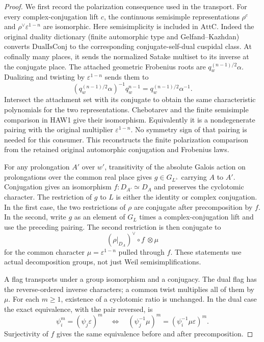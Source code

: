 \begin{proof}
We first record the polarization consequence used in the
transport.  For every complex-conjugation lift $c$, the
continuous semisimple representations
$\rho^c$ and $\rho^\vee\varepsilon^{1-n}$ are isomorphic.
Here semisimplicity is included in $\mathrm{AttC}$.
Indeed the original duality dictionary (finite automorphic
type and Gelfand--Kazhdan) converts $\mathrm{DualIsConj}$
to the corresponding conjugate-self-dual cuspidal class.
At cofinally many places, it sends the normalized Satake
multiset to its inverse at the conjugate place.  The attached
geometric Frobenius roots are $q_w^{(n-1)/2}\alpha$.
Dualizing and twisting by $\varepsilon^{1-n}$ sends them to
\[
       (q_w^{(n-1)/2}\alpha)^{-1}q_w^{n-1}
                             =q_w^{(n-1)/2}\alpha^{-1}.
\]
Intersect the attachment set with its conjugate to obtain
the same characteristic polynomials for the two
representations.  Chebotarev and the finite semisimple
comparison in HAW1 give their isomorphism.  Equivalently it
is a nondegenerate pairing with the original multiplier
$\varepsilon^{1-n}$.  No symmetry sign of that pairing is
needed for this consumer.  This reconstructs the finite
polarization comparison from the retained original
automorphic conjugation and Frobenius laws.

For any prolongation $A'$ over $w'$, transitivity of the
absolute Galois action on prolongations over the common real
place gives $g\in G_{L^+}$ carrying $A$ to $A'$.  Conjugation
gives an isomorphism $f:D_{A'}\simeq D_A$ and preserves
the cyclotomic character.  The restriction of $g$ to $L$ is
either the identity or complex conjugation.  In the first
case, the two restrictions of $\rho$ are conjugate after
precomposition by $f$.  In the second, write $g$ as an
element of $G_L$ times a complex-conjugation lift and use
the preceding pairing.  The second restriction is then
conjugate to
\[
          (\rho|_{D_A})^\vee\circ f\ \otimes\mu
 \tag{HAW.21}
\]
for the common character $\mu=\varepsilon^{1-n}$ pulled
through $f$.  These statements use actual decomposition
groups, not just Weil semisimplifications.

A flag transports under a group isomorphism and a conjugacy.
The dual flag has the reverse-ordered inverse characters;
a common twist multiplies all of them by $\mu$.
For each $m\ge1$, existence of a cyclotomic ratio is unchanged.
In the dual case the exact equivalence, with the pair reversed,
is
\[
 \psi_i^m=(\psi_j\varepsilon)^m
 \quad\Longleftrightarrow\quad
 (\psi_j^{-1}\mu)^m=(\psi_i^{-1}\mu\varepsilon)^m.
 \tag{HAW.22}
\]
Surjectivity of $f$ gives the same equivalence before and
after precomposition.


\end{proof}
